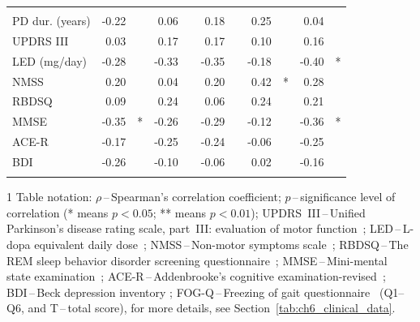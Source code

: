 \begin{table}[htb!]
\begin{threeparttable}
\begin{tabular}{l r c r c r c r c r c}
			\noalign{\smallskip}\hline\noalign{\smallskip}
			\multicolumn{11}{c}{$\Delta$ (Session 2 $-$ Session 1)} \\
			\noalign{\smallskip}\hline\noalign{\smallskip}

			PD dur. (years)  & -0.22 &    &  0.06 &    &  0.18 &    &  0.25 &    &  0.04 &    \\
			UPDRS III        &  0.03 &    &  0.17 &    &  0.17 &    &  0.10 &    &  0.16 &    \\
			LED (mg/day)     & -0.28 &    & -0.33 &    & -0.35 &    & -0.18 &    & -0.40 & *  \\
			NMSS             &  0.20 &    &  0.04 &    &  0.20 &    &  0.42 & *  &  0.28 &    \\
			RBDSQ            &  0.09 &    &  0.24 &    &  0.06 &    &  0.24 &    &  0.21 &    \\
			MMSE             & -0.35 & *  & -0.26 &    & -0.29 &    & -0.12 &    & -0.36 & *  \\
			ACE-R            & -0.17 &    & -0.25 &    & -0.24 &    & -0.06 &    & -0.25 &    \\
			BDI              & -0.26 &    & -0.10 &    & -0.06 &    &  0.02 &    & -0.16 &    \\

			\noalign{\smallskip}\hline\hline
		\end{tabular}

		\begin{tablenotes}
			\scriptsize
			\item[1] Table notation: $\rho$\,--\,Spearman's correlation coefficient; $p$\,--\,significance level of correlation (* means $p<0.05$; ** means $p<0.01$); UPDRS~III\,--\,Unified Parkinson's disease rating scale, part~III: evaluation of motor function~\cite{Fahn1987}; LED\,--\,L-dopa equivalent daily dose~\cite{Lee2010}; NMSS\,--\,Non-motor symptoms scale~\cite{Chaudhuri2007}; RBDSQ\,--\,The REM sleep behavior disorder screening questionnaire~\cite{Stiasny2007}; MMSE\,--\,Mini-mental state examination~\cite{Folstein1975}; ACE-R\,--\,Addenbrooke's cognitive examination-revised~\cite{Larner2007}; BDI\,--\,Beck depression inventory \cite{Beck2000, Beck1961}; FOG-Q\,--\,Freezing of gait questionnaire~\cite{Giladi2000} (Q1--Q6, and T\,--\,total score), for more details, see Section~\ref{tab:ch6_clinical_data}.
		\end{tablenotes}
	\end{threeparttable}
\end{table}

